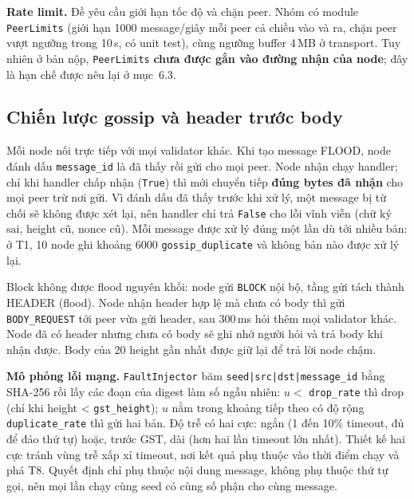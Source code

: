 \documentclass[11pt,a4paper]{article}
\newcommand{\code}[1]{\texttt{#1}}
\begin{document}
\textbf{Rate limit.} Đề yêu cầu giới hạn tốc độ và chặn peer. Nhóm có module \code{PeerLimits} (giới hạn 1000 message/giây mỗi peer cả chiều vào và ra, chặn peer vượt ngưỡng trong 10\,s, có unit test), cùng ngưỡng buffer 4\,MB ở transport. Tuy nhiên ở bản nộp, \code{PeerLimits} \textbf{chưa được gắn vào đường nhận của node}; đây là hạn chế được nêu lại ở mục~6.3.

\subsection{Chiến lược gossip và header trước body}
Mỗi node nối trực tiếp với mọi validator khác. Khi tạo message FLOOD, node đánh dấu \code{message\_id} là đã thấy rồi gửi cho mọi peer. Node nhận chạy handler; chỉ khi handler chấp nhận (\code{True}) thì mới chuyển tiếp \textbf{đúng bytes đã nhận} cho mọi peer trừ nơi gửi. Vì đánh dấu đã thấy trước khi xử lý, một message bị từ chối sẽ không được xét lại, nên handler chỉ trả \code{False} cho lỗi vĩnh viễn (chữ ký sai, height cũ, nonce cũ). Mỗi message được xử lý đúng một lần dù tới nhiều bản: ở T1, 10 node ghi khoảng 6000 \code{gossip\_duplicate} và không bản nào được xử lý lại.

Block không được flood nguyên khối: node gửi \code{BLOCK} nội bộ, tầng gửi tách thành HEADER (flood). Node nhận header hợp lệ mà chưa có body thì gửi \code{BODY\_REQUEST} tới peer vừa gửi header, sau 300\,ms hỏi thêm mọi validator khác. Node đã có header nhưng chưa có body sẽ ghi nhớ người hỏi và trả body khi nhận được. Body của 20 height gần nhất được giữ lại để trả lời node chậm.

\textbf{Mô phỏng lỗi mạng.} \code{FaultInjector} băm \code{seed|src|dst|message\_id} bằng SHA-256 rồi lấy các đoạn của digest làm số ngẫu nhiên: $u < $ \code{drop\_rate} thì drop (chỉ khi height < \code{gst\_height}); $u$ nằm trong khoảng tiếp theo có độ rộng \code{duplicate\_rate} thì gửi hai bản. Độ trễ có hai cực: ngắn (1 đến 10\% timeout, đủ để đảo thứ tự) hoặc, trước GST, dài (hơn hai lần timeout lớn nhất). Thiết kế hai cực tránh vùng trễ xấp xỉ timeout, nơi kết quả phụ thuộc vào thời điểm chạy và phá T8. Quyết định chỉ phụ thuộc nội dung message, không phụ thuộc thứ tự gọi, nên mọi lần chạy cùng seed có cùng số phận cho cùng message.
\end{document}
